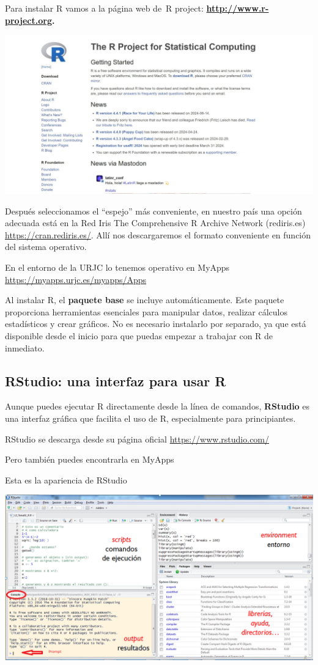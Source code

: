 \documentclass[
  letterpaper,
]{scrbook}
\begin{document}
Para instalar R vamos a la página web de~R project:
\href{http://www.r-project.org/}{\textbf{http://www.r-project.org}}\textbf{.}

\includegraphics{Prácticas_2025_26/Práctica_1/Imagenes/CRAN_2.jpeg}

Después seleccionamos el ``espejo'' más conveniente, en nuestro país una
opción adecuada está en la Red Iris The Comprehensive R Archive Network
(rediris.es) \url{https://cran.rediris.es/}. Allí nos descargaremos el
formato conveniente en función del sistema operativo.

En el entorno de la URJC lo tenemos operativo en MyApps
\url{https://myapps.urjc.es/myapps/Apps}

Al instalar R, el \textbf{paquete base} se incluye automáticamente. Este
paquete proporciona herramientas esenciales para manipular datos,
realizar cálculos estadísticos y crear gráficos. No es necesario
instalarlo por separado, ya que está disponible desde el inicio para que
puedas empezar a trabajar con R de inmediato.

\hypertarget{rstudio-una-interfaz-para-usar-r}{%
\subsection{RStudio: una interfaz para usar
R}\label{rstudio-una-interfaz-para-usar-r}}

Aunque puedes ejecutar R directamente desde la línea de comandos,
\textbf{RStudio} es una interfaz gráfica que facilita el uso de R,
especialmente para principiantes.

RStudio se descarga desde su página oficial
\url{https://www.rstudio.com/}

Pero también puedes encontrarla en MyApps

Esta es la apariencia de RStudio

\includegraphics{Prácticas_2025_26/Práctica_1/Imagenes/Rstudio_consola.png}
\end{document}
